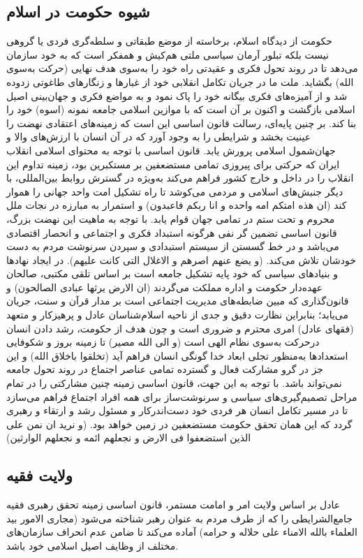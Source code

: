 \documentclass[12pt]{article}
\begin{document}
\subsection*{شیوه حکومت در اسلام‌}
حکومت از دیدگاه اسلام‌، برخاسته از موضع طبقاتی و سلطه‌گری ‌فردی یا گروهی نیست بلکه تبلور آرمان سیاسی ملتی هم‌کیش و همفکر است که به خود سازمان می‌دهد تا در روند تحول فکری و عقیدتی راه خود را به‌سوی هدف نهایی (حرکت به‌سوی الله) بگشاید. ملت ما در جریان تکامل انقلابی خود از غبارها و زنگارهای طاغوتی زدوده شد و از آمیزه‌های فکری بیگانه خود را پاک نمود و به مواضع فکری و جهان‌بینی اصیل اسلامی بازگشت و اکنون بر آن است که با موازین اسلامی جامعه نمونه (اسوه‌) خود را بنا کند. بر چنین پایه‌ای‌، رسالت قانون اساسی این است که زمینه‌های اعتقادی نهضت را عینیت بخشد و شرایطی را به وجود آورد که در آن انسان با ارزش‌های والا و جهان‌شمول اسلامی پرورش ‌یابد. قانون اساسی با توجه به محتوای اسلامی انقلاب ایران که حرکتی برای پیروزی تمامی مستضعفین بر مستکبرین بود، زمینه تداوم این انقلاب را در داخل و خارج کشور فراهم می‌کند به‌ویژه در گسترش روابط بین‌المللی‌، با دیگر جنبش‌های اسلامی و مردمی می‌کوشد تا راه تشکیل امت واحد جهانی را هموار کند (ان هذه امتکم امه واحده و انا ربکم فاعبدون) و استمرار به مبارزه در نجات ملل محروم و تحت ستم در تمامی جهان قوام یابد. با توجه به ماهیت این نهضت بزرگ‌، قانون اساسی تضمین گر نفی هرگونه استبداد فکری و اجتماعی و انحصار اقتصادی می‌باشد و در خط گسستن از سیستم استبدادی‌ و سپردن سرنوشت مردم به دست خودشان تلاش می‌کند. (و یضع عنهم اصرهم و الاغلال التی کانت علیهم). در ایجاد نهادها و بنیادهای سیاسی که خود پایه تشکیل جامعه است ‌بر اساس تلقی مکتبی‌، صالحان عهده‌دار حکومت و اداره مملکت ‌می‌گردند (ان الارض یرثها عبادی الصالحون) و قانون‌گذاری که مبین ضابطه‌های مدیریت اجتماعی است بر مدار قرآن و سنت‌، جریان‌ می‌یابد؛ بنابراین نظارت دقیق و جدی از ناحیه اسلام‌شناسان عادل و پرهیزکار و متعهد (فقهای عادل‌) امری محترم و ضروری است و چون هدف از حکومت‌، رشد دادن انسان درحرکت به‌سوی ‌نظام الهی است (و الی الله مصیر) تا زمینه بروز و شکوفایی استعدادها به‌منظور تجلی ابعاد خدا گونگی انسان فراهم آید (تخلقوا باخلاق الله) و این جز در گرو مشارکت فعال و گسترده تمامی عناصر اجتماع در روند تحول جامعه نمی‌تواند باشد. با توجه به این جهت‌، قانون اساسی زمینه چنین مشارکتی را در تمام مراحل تصمیم‌گیری‌های سیاسی و سرنوشت‌ساز برای همه افراد اجتماع فراهم می‌سازد تا در مسیر تکامل انسان هر فردی خود دست‌اندرکار و مسئول رشد و ارتقاء و رهبری گردد که این همان تحقق حکومت مستضعفین در زمین خواهد بود. (و نرید ان نمن علی الذین استضعفوا فی الارض و نجعلهم ائمه و نجعلهم الوارثین)

\subsection*{ولایت فقیه}
عادل ‌بر اساس ولایت امر و امامت مستمر، قانون اساسی زمینه تحقق رهبری فقیه جامع‌الشرایطی را که از طرف مردم به عنوان رهبر شناخته می‌شود (مجاری الامور بید العلماء بالله الامناء علی حلاله و حرامه) آماده می‌کند تا ضامن عدم انحراف سازمان‌های مختلف از وظایف اصیل اسلامی خود باشد.
\end{document}
